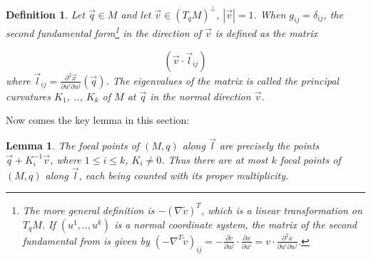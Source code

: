 \documentclass[a4paper,11pt,reqno]{amsart}
\newtheorem{lem}[thm]{Lemma}
\newtheorem{defn}[thm]{Definition}
\newcommand{\vect}[1]{\vec{#1}}
\begin{document}
\begin{defn}
  Let $\vect{q} \in M$ and let $\vect{v} \in (T_qM)^\perp$, $|\vect{v}| =
  1$. When $g_{ij} = \delta_{ij}$, the second fundamental form\footnote{The more
    general definition is $-(\nabla \tilde{v})^T$, which is a linear
    transformation on $T_qM$. If $(u^1, .., u^k)$ is a normal coordinate system,
    the matrix of the second fundamental from is given by $(-\nabla^T
    \tilde{v})_{ij} = -\frac{\partial \tilde{v}}{\partial u^j} \cdot
    \frac{\partial x}{\partial u^i} = v \cdot \frac{\partial^2 x}{\partial
      u^i \partial u^j}$.} in the direction of $\vect{v}$ is defined as the
  matrix

  \begin{equation}
    \left(
      \vect{v} \cdot \vect{l}_{ij}
    \right)
  \end{equation}
  where $\vect{l}_{ij} = \frac{\partial^2 \vect{x}}{\partial u^i \partial
    u^j}(\vect{q})$.
  The eigenvalues of the matrix is called the principal curvatures $K_1$, ..,
  $K_k$ of $M$ at $\vect{q}$ in the normal direction $\vect{v}$.
\end{defn}

Now comes the key lemma in this section:

\begin{lem}
  The focal points of $(M, q)$ along $\vect{l}$  are precisely the points
  $\vect{q}+K_i^{-1}\vect{v}$, where $1 \le i \le k$, $K_i \ne 0$. Thus there
  are at most $k$ focal points of $(M,q)$ along $\vect{l}$, each being counted
  with its proper multiplicity.
\end{lem}
\end{document}
